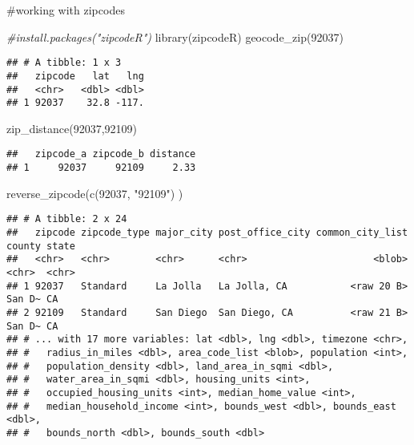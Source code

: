 \documentclass[
]{article}
\newenvironment{Shaded}{\begin{snugshade}}{\end{snugshade}}
\newcommand{\CommentTok}[1]{\textcolor[rgb]{0.56,0.35,0.01}{\textit{#1}}}
\newcommand{\FunctionTok}[1]{\textcolor[rgb]{0.00,0.00,0.00}{#1}}
\newcommand{\NormalTok}[1]{#1}
\newcommand{\StringTok}[1]{\textcolor[rgb]{0.31,0.60,0.02}{#1}}
\begin{document}
\#working with zipcodes

\begin{Shaded}
\begin{Highlighting}[]
\CommentTok{\#install.packages("zipcodeR")}
\FunctionTok{library}\NormalTok{(zipcodeR)}
\FunctionTok{geocode\_zip}\NormalTok{(}\StringTok{\textquotesingle{}92037\textquotesingle{}}\NormalTok{)}
\end{Highlighting}
\end{Shaded}

\begin{verbatim}
## # A tibble: 1 x 3
##   zipcode   lat   lng
##   <chr>   <dbl> <dbl>
## 1 92037    32.8 -117.
\end{verbatim}

\begin{Shaded}
\begin{Highlighting}[]
\FunctionTok{zip\_distance}\NormalTok{(}\StringTok{\textquotesingle{}92037\textquotesingle{}}\NormalTok{,}\StringTok{\textquotesingle{}92109\textquotesingle{}}\NormalTok{)}
\end{Highlighting}
\end{Shaded}

\begin{verbatim}
##   zipcode_a zipcode_b distance
## 1     92037     92109     2.33
\end{verbatim}

\begin{Shaded}
\begin{Highlighting}[]
\FunctionTok{reverse\_zipcode}\NormalTok{(}\FunctionTok{c}\NormalTok{(}\StringTok{\textquotesingle{}92037\textquotesingle{}}\NormalTok{, }\StringTok{"92109"}\NormalTok{) )}
\end{Highlighting}
\end{Shaded}

\begin{verbatim}
## # A tibble: 2 x 24
##   zipcode zipcode_type major_city post_office_city common_city_list county state
##   <chr>   <chr>        <chr>      <chr>                      <blob> <chr>  <chr>
## 1 92037   Standard     La Jolla   La Jolla, CA           <raw 20 B> San D~ CA   
## 2 92109   Standard     San Diego  San Diego, CA          <raw 21 B> San D~ CA   
## # ... with 17 more variables: lat <dbl>, lng <dbl>, timezone <chr>,
## #   radius_in_miles <dbl>, area_code_list <blob>, population <int>,
## #   population_density <dbl>, land_area_in_sqmi <dbl>,
## #   water_area_in_sqmi <dbl>, housing_units <int>,
## #   occupied_housing_units <int>, median_home_value <int>,
## #   median_household_income <int>, bounds_west <dbl>, bounds_east <dbl>,
## #   bounds_north <dbl>, bounds_south <dbl>
\end{verbatim}
\end{document}
